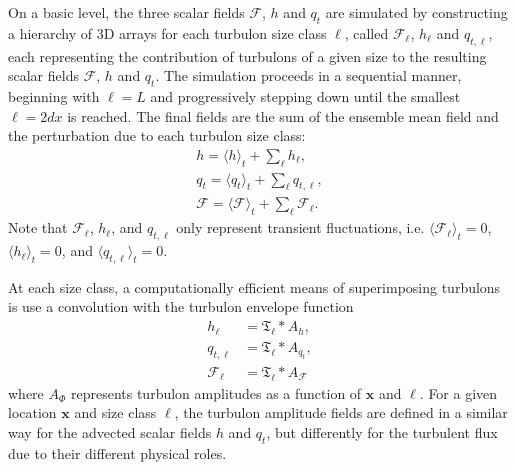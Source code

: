 \documentclass[acp, manuscript, english]{copernicus}
\begin{document}
On a basic level, the three scalar fields $\mathcal{F}$, $h$ and $q_t$ are simulated by constructing a hierarchy of 3D arrays for each turbulon size class $\ell$, called $\mathcal{F}_\ell$, $h_\ell$ and $q_{t,\ell}$, each representing the contribution of turbulons of a given size to the resulting scalar fields $\mathcal{F}$, $h$ and $q_t$. The simulation proceeds in a sequential manner, beginning with $\ell=L$ and progressively stepping down until the smallest $\ell=2dx$ is reached. The final fields are the sum of the ensemble mean field and the perturbation due to each turbulon size class:
\begin{align}
  h = \langle h \rangle_t + \sum_\ell h_\ell, \\
  q_t = \langle q_t \rangle_t + \sum_\ell q_{t,\ell}, \\
  \mathcal{F} = \langle \mathcal{F} \rangle_t + \sum_\ell \mathcal{F}_\ell.
\end{align} 
Note that $\mathcal{F}_\ell$, $h_\ell$, and $q_{t,\ell}$ only represent transient fluctuations, i.e. $\langle\mathcal{F}_\ell\rangle_t = 0$, $\langle h_\ell\rangle_t = 0$, and $\langle q_{t,\ell}\rangle_t = 0$.

At each size class, a computationally efficient means of superimposing turbulons is use a convolution with the turbulon envelope function
\begin{align}
  h_\ell &=  \mathfrak{T}_\ell * A_h, \\
q_{t,\ell} &=  \mathfrak{T}_\ell * A_{q_t}, \\
\mathcal{F}_\ell &=  \mathfrak{T}_\ell * A_\mathcal{F}
\end{align}
where $A_\Phi$ represents turbulon amplitudes as a function of $\mathbf{x}$ and $\ell$.
For a given location $\mathbf{x}$ and size class $\ell$, the turbulon amplitude fields are defined in a similar way for the advected scalar fields $h$ and $q_t$, but differently for the turbulent flux due to their different physical roles.
\end{document}
